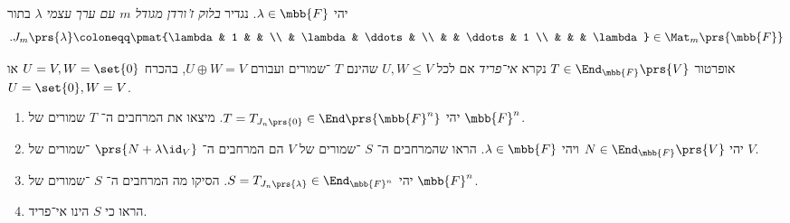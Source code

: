 \documentclass[a4paper,10pt,twoside,openany]{book}
\begin{document}
\begin{definition}
יהי
$\lambda \in \mbb{F}$.
נגדיר
\emph{בלוק ז'ורדן מגודל
$m$
עם ערך עצמי
$\lambda$}
בתור
\begin{align*}
\text{.} J_m\prs{\lambda} \coloneqq \pmat{\lambda & 1 & & \\ & \lambda & \ddots & \\ & & \ddots & 1 \\ & & & \lambda} \in \Mat_m\prs{\mbb{F}}
\end{align*}
\end{definition}

\begin{definition}
אופרטור
$T \in \End_{\mbb{F}}\prs{V}$
נקרא
\emph{אי־פריד}
אם לכל
$U,W \leq V$
שהינם
$T$%
־שמורים ועבורם
$U \oplus W = V$,
בהכרח
$U = V, W = \set{0}$
או
$U = \set{0}, W = V$.
\end{definition}

\begin{exercisechap}
\begin{enumerate}
\item יהי
$T = T_{J_n\prs{0}} \in \End\prs{\mbb{F}^n}$.
מיצאו את המרחבים ה־%
$T$
שמורים של
$\mbb{F}^n$.

\item יהי
$N \in \End_{\mbb{F}}\prs{V}$
ויהי
$\lambda \in \mbb{F}$.
הראו שהמרחבים ה־%
$S$
־שמורים של
$V$
הם המרחבים ה־%
$\prs{N + \lambda \id_V}$
־שמורים של
$V$.

\item יהי
$S = T_{J_n\prs{\lambda}} \in \End_{\mbb{F}^n}$.
הסיקו מה המרחבים ה־%
$S$%
־שמורים של
$\mbb{F}^n$.

\item
הראו כי
$S$
הינו אי־פריד.
\end{enumerate}
\end{exercisechap}
\end{document}
